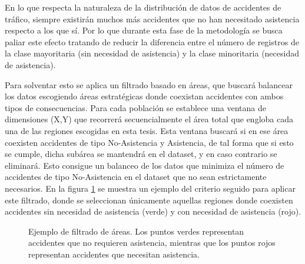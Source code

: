 \documentclass{uathesis-es}
\begin{document}
En lo que respecta la naturaleza de la distribución de datos de accidentes de tráfico, siempre existirán muchos más accidentes que no han necesitado asistencia respecto a los que sí. Por lo que durante esta fase de la metodología se busca paliar este efecto tratando de reducir la diferencia entre el número de registros de la clase mayoritaria (sin necesidad de asistencia) y la clase minoritaria (necesidad de asistencia).

Para solventar esto se aplica un filtrado basado en áreas, que buscará balancear los datos escogiendo áreas estratégicas donde coexistan accidentes con ambos tipos de consecuencias. Para cada población se establece una ventana de dimensiones (X,Y) que recorrerá secuencialmente el área total que engloba cada una de las regiones escogidas en esta tesis. Esta ventana buscará si en ese área coexisten accidentes de tipo No-Asistencia y Asistencia, de tal forma que si esto se cumple, dicha subárea se mantendrá en el dataset, y en caso contrario se eliminará. Esto consigue un balanceo de los datos que minimiza el número de accidentes de tipo No-Asistencia en el dataset que no sean estrictamente necesarios. En la figura \ref{Areas} se muestra un ejemplo del criterio seguido para aplicar este filtrado, donde se seleccionan únicamente aquellas regiones donde coexisten accidentes sin necesidad de asistencia (verde) y con necesidad de asistencia (rojo).

\begin{figure}[H]
    \centering    
    \caption{Ejemplo de filtrado de áreas. Los puntos verdes representan accidentes que no requieren asistencia, mientras que los puntos rojos representan accidentes que necesitan asistencia.}
    \label{Areas}
\end{figure}
\end{document}
